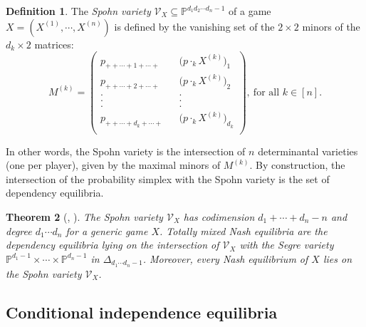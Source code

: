 \documentclass[11pt]{amsart}
\numberwithin{equation}{section}
\theoremstyle{plain}
\newtheorem{theorem}{Theorem}
\numberwithin{theorem}{section}
\theoremstyle{definition}
\newtheorem{definition}[theorem]{Definition}
\begin{document}
\begin{definition}\label{Definition $1.22$}
   The \textit{Spohn variety} $\mathcal V_X\subseteq\mathbb P^{d_1 d_2 \cdots d_n-1}$ of a game $X = (X^{(1)}, \cdots, X^{(n)})$ is defined by the vanishing set of the $2\times2$ minors of the $d_k\times2$ matrices: $$M^{(k)}=\left(\begin{matrix}
    p_{++\cdots+1+\cdots+} & &\big(p\cdot_k X^{(k)}\big)_{1}\\
    p_{++\cdots+2+\cdots+} & &\big(p\cdot_k X^{(k)}\big)_{2}\\
    . & &.\\
    .&&.\\
    .&&.\\
    p_{++\cdots+d_k+\cdots+} && \big(p\cdot_k X^{(k)}\big)_{d_k}\\
\end{matrix}\right),~\text{for all }k\in[n].$$ 
\end{definition}


\noindent In other words, the Spohn variety is the intersection of $n$ determinantal varieties (one per player), given by the maximal minors of $M^{(k)}$. By construction, the intersection of the probability simplex with the Spohn variety is the set of dependency equilibria.


\begin{theorem}[{\cite[Theorem $6$]{portakal2022geometry}, \cite[Theorem $3.18$]{portakal2024dependency}}]\label{Proposition $1.19$}\label{Proposition $1.20$}
    The Spohn variety $\mathcal V_X$ has codimension $d_1 + \cdots +d_n -n$ and degree $d_1 \cdots d_n$ for a generic game $X$. Totally mixed Nash equilibria are the dependency equilibria lying on the intersection of $\mathcal V_X$ with the Segre variety $\mathbb P^{d_1 -1} \times\cdots\times \mathbb P^{d_n -1}$ in $\Delta_{d_1 \cdots d_n -1}$. Moreover, every Nash equilibrium of $X$ lies on the Spohn variety $\mathcal V_X$.
\end{theorem}



\subsection{Conditional independence equilibria}
\end{document}
